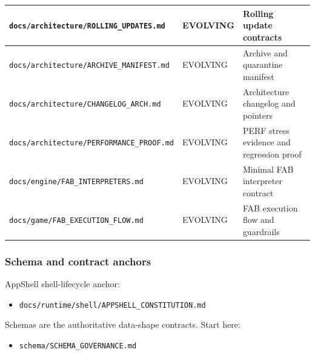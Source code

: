 \documentclass[9pt,a4paper,openany]{book}
\newcommand{\toprule}{\hline}
\newcommand{\midrule}{\hline}
\newcommand{\bottomrule}{\hline}
\begin{document}
\begin{center}
{\small\renewcommand{\arraystretch}{1.18}
\begin{tabularx}{\linewidth}{@{}>{\raggedright\arraybackslash}X >{\raggedright\arraybackslash}X >{\raggedright\arraybackslash}X@{}}
\toprule
\textbf{\texttt{docs/\allowbreak{}architecture/\allowbreak{}ROLLING\_\allowbreak{}UPDATES.\allowbreak{}md}} & \textbf{EVOLVING} & \textbf{Rolling update contracts} \\
\midrule
\texttt{docs/\allowbreak{}architecture/\allowbreak{}ARCHIVE\_\allowbreak{}MANIFEST.\allowbreak{}md} & EVOLVING & Archive and quarantine manifest \\
\texttt{docs/\allowbreak{}architecture/\allowbreak{}CHANGELOG\_\allowbreak{}ARCH.\allowbreak{}md} & EVOLVING & Architecture changelog and pointers \\
\texttt{docs/\allowbreak{}architecture/\allowbreak{}PERFORMANCE\_\allowbreak{}PROOF.\allowbreak{}md} & EVOLVING & PERF stress evidence and regression proof \\
\texttt{docs/\allowbreak{}engine/\allowbreak{}FAB\_\allowbreak{}INTERPRETERS.\allowbreak{}md} & EVOLVING & Minimal FAB interpreter contract \\
\texttt{docs/\allowbreak{}game/\allowbreak{}FAB\_\allowbreak{}EXECUTION\_\allowbreak{}FLOW.\allowbreak{}md} & EVOLVING & FAB execution flow and guardrails \\
\bottomrule
\end{tabularx}
}
\end{center}





\subsubsection{Schema and contract anchors}

AppShell shell-\allowbreak{}lifecycle anchor:


\begin{itemize}
\item \texttt{docs/\allowbreak{}runtime/\allowbreak{}shell/\allowbreak{}APPSHELL\_\allowbreak{}CONSTITUTION.\allowbreak{}md}
\end{itemize}

Schemas are the authoritative data-\allowbreak{}shape contracts.\allowbreak{} Start here:



\begin{itemize}
\item \texttt{schema/\allowbreak{}SCHEMA\_\allowbreak{}GOVERNANCE.\allowbreak{}md}
\end{itemize}
\end{document}
